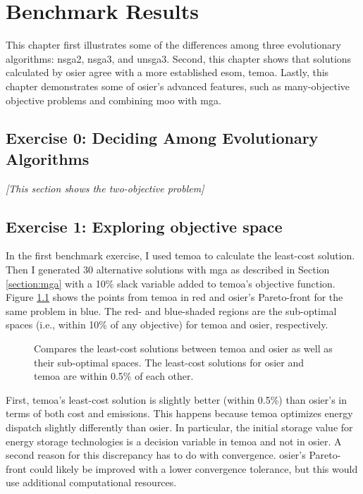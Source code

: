 \chapter{Benchmark Results}
\label{chapter:benchmark-results}

This chapter first illustrates some of the differences among three evolutionary
algorithms: \ac{nsga2}, \ac{nsga3}, and \ac{unsga3}. Second, this chapter shows 
that solutions calculated by \ac{osier} agree with a more established \ac{esom}, 
\ac{temoa}. Lastly, this chapter demonstrates some of \ac{osier}'s advanced features, 
such as many-objective objective problems and combining \ac{moo} with \ac{mga}.

\section{Exercise 0: Deciding Among Evolutionary Algorithms}

\textit{[This section shows the two-objective problem]}

\section{Exercise 1: Exploring objective space}
In the first benchmark exercise, I used \ac{temoa} to calculate the least-cost
solution. Then I generated 30 alternative solutions with \ac{mga} as described
in Section \ref{section:mga} with a 10\% slack variable added to \ac{temoa}'s
objective function. Figure \ref{fig:temoa-benchmark-01} shows the points from
\ac{temoa} in red and \ac{osier}'s Pareto-front for the same problem in blue.
The red- and blue-shaded regions are the sub-optimal spaces (i.e., within 10\%
of any objective) for \ac{temoa} and \ac{osier}, respectively.

\begin{figure}[h]
  \centering
  \resizebox{0.6\columnwidth}{!}{}
  \caption{Compares the least-cost solutions between \acs{temoa}
  and \acs{osier} as well as their sub-optimal spaces. The least-cost solutions
  for \ac{osier} and \ac{temoa} are within 0.5\% of each other.}
  \label{fig:temoa-benchmark-01}
\end{figure}

First, \ac{temoa}'s least-cost solution is slightly better (within 0.5\%) than
\ac{osier}'s in terms of both cost and emissions. This happens because
\ac{temoa} optimizes energy dispatch slightly differently than \ac{osier}. In
particular, the initial storage value for energy storage technologies is a
decision variable in \ac{temoa} and not in \ac{osier}. A second reason for this
discrepancy has to do with convergence. \ac{osier}'s Pareto-front could likely
be improved with a lower convergence tolerance, but this would use additional
computational resources.

